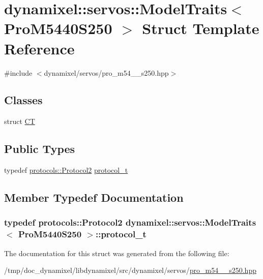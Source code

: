 \hypertarget{structdynamixel_1_1servos_1_1_model_traits_3_01_pro_m5440_s250_01_4}{}\section{dynamixel\+:\+:servos\+:\+:Model\+Traits$<$ Pro\+M5440\+S250 $>$ Struct Template Reference}
\label{structdynamixel_1_1servos_1_1_model_traits_3_01_pro_m5440_s250_01_4}


{\ttfamily \#include $<$dynamixel/servos/pro\+\_\+m54\+\_\+\_\+s250.\+hpp$>$}

\subsection*{Classes}
\begin{DoxyCompactItemize}
\item 
struct \hyperlink{structdynamixel_1_1servos_1_1_model_traits_3_01_pro_m5440_s250_01_4_1_1_c_t}{C\+T}
\end{DoxyCompactItemize}
\subsection*{Public Types}
\begin{DoxyCompactItemize}
\item 
typedef \hyperlink{classdynamixel_1_1protocols_1_1_protocol2}{protocols\+::\+Protocol2} \hyperlink{structdynamixel_1_1servos_1_1_model_traits_3_01_pro_m5440_s250_01_4_afd94f6cce163097901ea4d7ff080ab34}{protocol\+\_\+t}
\end{DoxyCompactItemize}


\subsection{Member Typedef Documentation}
\hypertarget{structdynamixel_1_1servos_1_1_model_traits_3_01_pro_m5440_s250_01_4_afd94f6cce163097901ea4d7ff080ab34}{}
\subsubsection[{protocol\+\_\+t}]{\setlength{\rightskip}{0pt plus 5cm}typedef {\bf protocols\+::\+Protocol2} {\bf dynamixel\+::servos\+::\+Model\+Traits}$<$ {\bf Pro\+M5440\+S250} $>$\+::{\bf protocol\+\_\+t}}\label{structdynamixel_1_1servos_1_1_model_traits_3_01_pro_m5440_s250_01_4_afd94f6cce163097901ea4d7ff080ab34}


The documentation for this struct was generated from the following file\+:\begin{DoxyCompactItemize}
\item 
/tmp/doc\+\_\+dynamixel/libdynamixel/src/dynamixel/servos/\hyperlink{pro__m54__40__s250_8hpp}{pro\+\_\+m54\+\_\+\_\+s250.\+hpp}\end{DoxyCompactItemize}
